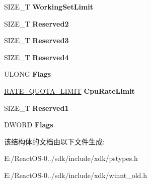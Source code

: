 \begin{DoxyCompactItemize}
S\+I\+Z\+E\+\_\+T {\bfseries Working\+Set\+Limit}
\item 
\mbox{\label{struct___q_u_o_t_a___l_i_m_i_t_s___e_x_aee25143b52406261c140a7f5829918b8}} 
S\+I\+Z\+E\+\_\+T {\bfseries Reserved2}
\item 
\mbox{\label{struct___q_u_o_t_a___l_i_m_i_t_s___e_x_a7e66b2222b9e29268210e43aee453bc4}} 
S\+I\+Z\+E\+\_\+T {\bfseries Reserved3}
\item 
\mbox{\label{struct___q_u_o_t_a___l_i_m_i_t_s___e_x_a90282d70a51f90d08db9c0c5221d9674}} 
S\+I\+Z\+E\+\_\+T {\bfseries Reserved4}
\item 
\mbox{\label{struct___q_u_o_t_a___l_i_m_i_t_s___e_x_a8e6c6410f690678f2cb57149ad5bf8f8}} 
U\+L\+O\+NG {\bfseries Flags}
\item 
\mbox{\label{struct___q_u_o_t_a___l_i_m_i_t_s___e_x_ab0beba91a43aafd1bb0aebd3be0bc29d}} 
\hyperlink{union___r_a_t_e___q_u_o_t_a___l_i_m_i_t}{R\+A\+T\+E\+\_\+\+Q\+U\+O\+T\+A\+\_\+\+L\+I\+M\+IT} {\bfseries Cpu\+Rate\+Limit}
\item 
\mbox{\label{struct___q_u_o_t_a___l_i_m_i_t_s___e_x_a76b526559f9fda2aff6fca1f263860a8}} 
S\+I\+Z\+E\+\_\+T {\bfseries Reserved1}
\item 
\mbox{\label{struct___q_u_o_t_a___l_i_m_i_t_s___e_x_a5509a828f17284e5d6bc51dca03d8b63}} 
D\+W\+O\+RD {\bfseries Flags}
\end{DoxyCompactItemize}


该结构体的文档由以下文件生成\+:\begin{DoxyCompactItemize}
\item 
E\+:/\+React\+O\+S-\/0../sdk/include/xdk/pstypes.\+h\item 
E\+:/\+React\+O\+S-\/0../sdk/include/xdk/winnt\+\_\+old.\+h\end{DoxyCompactItemize}
